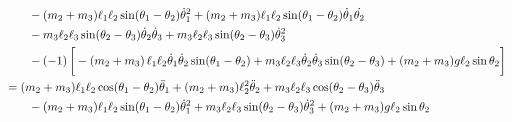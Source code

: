 \documentclass[letterpaper,8pt]{article}
\begin{document}
\begin{align*}
& \qquad   - (m_2 + m_3) \ell_1 \ell_2 \sin (\theta_1 - \theta_2) \dot{\theta}_1^2 + (m_2 + m_3) \ell_1 \ell_2 \sin (\theta_1 - \theta_2) \dot{\theta}_1\dot{\theta_2} \\
& \qquad   - m_3 \ell_2 \ell_3 \sin (\theta_2 - \theta_3) \dot{\theta}_2\dot{\theta}_3 + m_3 \ell_2 \ell_3 \sin (\theta_2 - \theta_3) \dot{\theta}_3^2 \\
& \qquad - (-1) \left[ \vphantom{\frac{1}{2}} -\left( m_2 + m_3 \right) \ell_1\ell_2\dot{\theta}_1\dot{\theta}_2\sin (\theta_1 - \theta_2)  
            + m_3 \ell_2\ell_3\dot{\theta}_2\dot{\theta}_3 \sin(\theta_2 - \theta_3)
            + (m_2 + m_3) g \ell_2 \sin \theta_2 \right] \\
&= (m_2 + m_3) \ell_1 \ell_2 \cos (\theta_1 - \theta_2) \ddot{\theta}_1 + (m_2 + m_3) \ell_2^2 \ddot{\theta}_2 + m_3 \ell_2 \ell_3 \cos (\theta_2 - \theta_3) \ddot{\theta}_3 \\
& \qquad    - (m_2 + m_3) \ell_1 \ell_2 \sin (\theta_1 - \theta_2) \dot{\theta}_1^2 + m_3 \ell_2 \ell_3 \sin (\theta_2 - \theta_3) \dot{\theta}_3^2 + (m_2 + m_3) g \ell_2 \sin \theta_2 
\end{align*}
\end{document}
